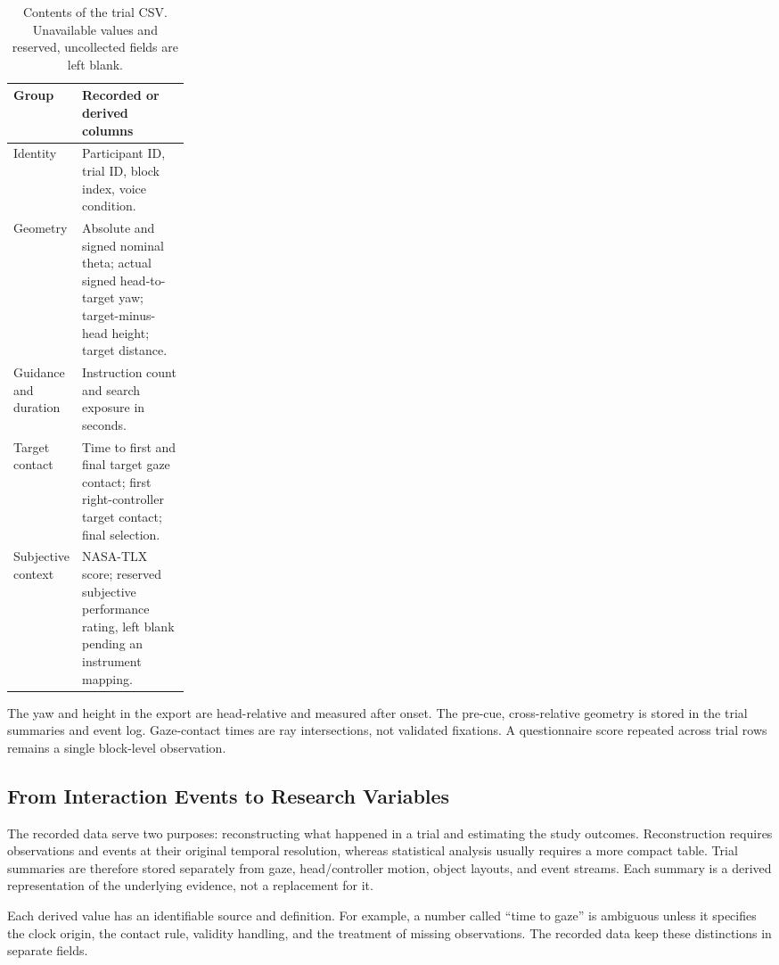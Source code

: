 \begin{table}[htbp]\centering
\caption[Trial CSV contents]{Contents of the trial CSV. Unavailable values and reserved, uncollected fields are left blank.}
\label{tab:trial-fields}
\small{}
\begin{tabularx}{\linewidth}{@{}p{0.23\linewidth}X@{}}\toprule
Group & Recorded or derived columns \\\midrule
Identity & Participant ID, trial ID, block index, voice condition. \\
Geometry & Absolute and signed nominal theta; actual signed head-to-target yaw; target-minus-head height; target distance. \\
Guidance and duration & Instruction count and search exposure in seconds. \\
Target contact & Time to first and final target gaze contact; first right-controller target contact; final selection. \\
Subjective context & NASA-TLX score; reserved subjective performance rating, left blank pending an instrument mapping. \\\bottomrule
\end{tabularx}
\end{table}

The yaw and height in the export are head-relative and measured after onset. The pre-cue, cross-relative geometry is stored in the trial summaries and event log. Gaze-contact times are ray intersections, not validated fixations. A questionnaire score repeated across trial rows remains a single block-level observation.

\subsection{From Interaction Events to Research Variables}
The recorded data serve two purposes: reconstructing what happened in a trial and estimating the study outcomes. Reconstruction requires observations and events at their original temporal resolution, whereas statistical analysis usually requires a more compact table. Trial summaries are therefore stored separately from gaze, head/controller motion, object layouts, and event streams. Each summary is a derived representation of the underlying evidence, not a replacement for it.

Each derived value has an identifiable source and definition. For example, a number called ``time to gaze'' is ambiguous unless it specifies the clock origin, the contact rule, validity handling, and the treatment of missing observations. The recorded data keep these distinctions in separate fields.

